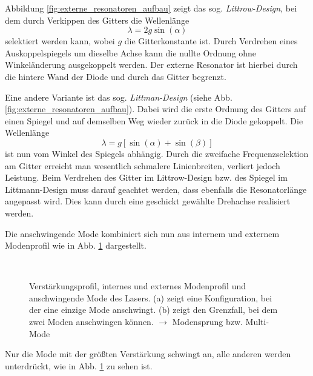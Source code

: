 Abbildung
\ref{fig:externe_resonatoren_aufbau} zeigt das sog.
\textit{Littrow-Design}, bei dem durch Verkippen des Gitters die Wellenlänge
\begin{equation}\label{eq:littrow}
	\lambda=2g\sin{(\alpha)}
\end{equation}
selektiert werden kann, wobei $g$ die Gitterkonstante ist. Durch Verdrehen eines
Auskoppelspiegels um dieselbe Achse kann die nullte Ordnung ohne Winkeländerung ausgekoppelt werden. Der
externe Resonator ist hierbei durch die hintere Wand der Diode und durch das
Gitter begrenzt.\par
Eine andere Variante ist das sog. \textit{Littman-Design} (siehe Abb.
\ref{fig:externe_resonatoren_aufbau}).
Dabei wird die erste Ordnung des Gitters auf einen Spiegel und auf demselben Weg wieder zurück in die
Diode gekoppelt. Die Wellenlänge
\begin{equation}\label{eq:littmann}
	\lambda=g\left[\sin{(\alpha)}+\sin{(\beta)}\right]
\end{equation}
ist nun vom Winkel des Spiegels abhängig. Durch die zweifache Frequenzselektion
am Gitter erreicht man wesentlich schmalere Linienbreiten, verliert jedoch
Leistung. Beim Verdrehen des Gitter im Littrow-Design bzw. des Spiegel im
Littmann-Design muss darauf geachtet werden, dass ebenfalls die Resonatorlänge
angepasst wird. Dies kann durch eine geschickt gewählte Drehachse realisiert
werden.\par Die anschwingende Mode kombiniert sich nun aus internem und externem Modenprofil
wie in Abb. \ref{fig:moden_frequenzselektion} dargestellt.
\begin{figure}[h]
	\footnotesize	
	\centering
	\subfloat[]{
		\label{subfig:moden_frequenzselektion_a}
		
  	}\\
	\subfloat[]{
		\label{subfig:moden_frequenzselektion_b}
		
  	}
	\caption[Diodenlaser - Verstärkungsprofil]{Verstärkungsprofil, internes und
	externes Modenprofil und anschwingende Mode des Lasers. (a) zeigt eine
	Konfiguration, bei der eine einzige Mode anschwingt.
	(b) zeigt den Grenzfall, bei dem zwei Moden anschwingen können. $\rightarrow$
	Modensprung bzw. Multi-Mode}
	\label{fig:moden_frequenzselektion}
\end{figure}
Nur die Mode mit der größten Verstärkung schwingt an, alle anderen
werden unterdrückt, wie in Abb.
\ref{fig:moden_frequenzselektion} zu sehen ist.
